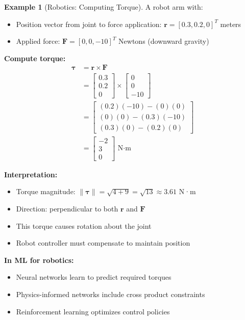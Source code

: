 \documentclass[12pt,a4paper]{article}
\theoremstyle{definition}
\newtheorem{example}{Example}[section]
\begin{document}
\begin{example}[Robotics: Computing Torque]
A robot arm with:
\begin{itemize}
    \item Position vector from joint to force application: $\mathbf{r} = [0.3, 0.2, 0]^T$ meters
    \item Applied force: $\mathbf{F} = [0, 0, -10]^T$ Newtons (downward gravity)
\end{itemize}

\textbf{Compute torque:}
\begin{align}
\boldsymbol{\tau} &= \mathbf{r} \times \mathbf{F} \\
&= \begin{bmatrix} 0.3 \\ 0.2 \\ 0 \end{bmatrix} \times \begin{bmatrix} 0 \\ 0 \\ -10 \end{bmatrix} \\
&= \begin{bmatrix}
(0.2)(-10) - (0)(0) \\
(0)(0) - (0.3)(-10) \\
(0.3)(0) - (0.2)(0)
\end{bmatrix} \\
&= \begin{bmatrix}
-2 \\
3 \\
0
\end{bmatrix} \text{ N·m}
\end{align}

\textbf{Interpretation:}
\begin{itemize}
    \item Torque magnitude: $\|\boldsymbol{\tau}\| = \sqrt{4 + 9} = \sqrt{13} \approx 3.61$ N·m
    \item Direction: perpendicular to both $\mathbf{r}$ and $\mathbf{F}$
    \item This torque causes rotation about the joint
    \item Robot controller must compensate to maintain position
\end{itemize}

\textbf{In ML for robotics:}
\begin{itemize}
    \item Neural networks learn to predict required torques
    \item Physics-informed networks include cross product constraints
    \item Reinforcement learning optimizes control policies
\end{itemize}
\end{example}
\end{document}

